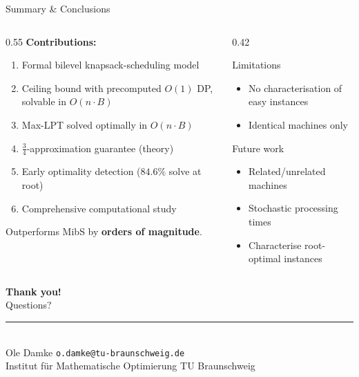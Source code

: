 \documentclass[fleqn,11pt,aspectratio=43]{beamer}
\begin{document}
\begin{frame}[shrink=5]{Summary \& Conclusions}
  \begin{columns}[T]
    \begin{column}{0.55\textwidth}
      \textbf{Contributions:}
      \begin{enumerate}
        \item Formal bilevel knapsack-scheduling model
        \item Ceiling bound with precomputed $O(1)$ DP, solvable in $O(n\cdot B)$
        \item Max-LPT solved optimally in $O(n\cdot B)$
        \item $\tfrac34$-approximation guarantee (theory)
        \item Early optimality detection ($84.6\%$ solve at root)
        \item Comprehensive computational study
      \end{enumerate}
      \smallskip
      Outperforms MibS by \textbf{orders of magnitude}.
    \end{column}
    \begin{column}{0.42\textwidth}
      \begin{alertblock}{Limitations}
        \small
        \begin{itemize}
          \item No characterisation of easy instances
          \item Identical machines only
        \end{itemize}
      \end{alertblock}
      \begin{block}{Future work}
        \small
        \begin{itemize}
          \item Related/unrelated machines
          \item Stochastic processing times
          \item Characterise root-optimal instances
        \end{itemize}
      \end{block}
    \end{column}
  \end{columns}
\end{frame}

\begin{frame}[plain]
  \begin{center}
    \vspace{3em}
    {\huge\bfseries Thank you!}\\[0.8em]
    {\Large Questions?}\\[1.6em]
    \rule{8cm}{0.4pt}\\[0.4em]
    {\small Ole Damke \;\textbullet\; \texttt{o.damke@tu-braunschweig.de}\\[0.2em]
           Institut für Mathematische Optimierung \;\textbullet\; TU Braunschweig}
  \end{center}
\end{frame}
\end{document}
